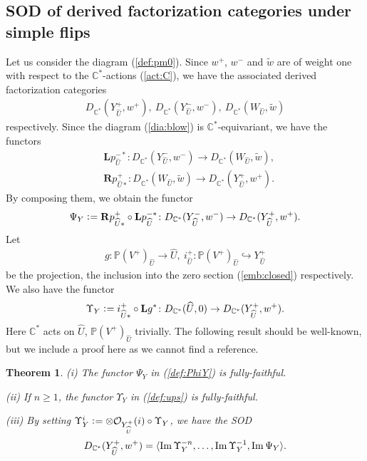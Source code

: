 \documentclass[11pt]{amsart}
\theoremstyle{plain}
\newtheorem{thm}{Theorem}[section]
\newcommand{\oO}{\mathcal{O}}
\newcommand{\dR}{\mathbf{R}}
\newcommand{\dL}{\mathbf{L}}
\newcommand{\Imm}{\mathop{\rm Im}\nolimits}
\begin{document}
\subsection{SOD of derived factorization categories under simple flips}
Let us consider the diagram (\ref{def:pm0}). 
Since $w^+$, $w^-$ and $\widetilde{w}$ are of
weight one with respect to the 
$\mathbb{C}^{\ast}$-actions (\ref{act:C}), 
we have the 
associated derived factorization categories
\begin{align*}
D_{\mathbb{C}^{\ast}}(Y_{\widehat{U}}^+, w^+), \ 
D_{\mathbb{C}^{\ast}}(Y_{\widehat{U}}^-, w^-), \ 
D_{\mathbb{C}^{\ast}}(W_{\widehat{U}}, \widetilde{w})
\end{align*}
respectively. 
Since the diagram (\ref{dia:blow}) is $\mathbb{C}^{\ast}$-equivariant, 
we have the functors
\begin{align*}
&\dL p_{\widehat{U}}^{-\ast} \colon 
D_{\mathbb{C}^{\ast}}(Y^-_{\widehat{U}}, w^-)
\to D_{\mathbb{C}^{\ast}}(W_{\widehat{U}}, \widetilde{w}), \\ 
&\dR p_{\widehat{U}\ast}^+ \colon 
D_{\mathbb{C}^{\ast}}(W_{\widehat{U}}, \widetilde{w})
\to 
D_{\mathbb{C}^{\ast}}(Y_{\widehat{U}}^+, w^+).
\end{align*}
By composing them, we obtain the functor
\begin{align}\label{def:PhiY}
\Psi_Y \cneq \dR p_{\widehat{U}\ast}^+ \circ \dL p_{\widehat{U}}^{-\ast} \colon 
D_{\mathbb{C}^{\ast}}(Y^-_{\widehat{U}}, w^-)
\to
D_{\mathbb{C}^{\ast}}(Y_{\widehat{U}}^+, w^+).
\end{align}
Let
\begin{align*}
g \colon \mathbb{P}(V^+)_{\widehat{U}} \to \widehat{U}, \
i_{\widehat{U}}^+ \colon \mathbb{P}(V^+)_{\widehat{U}} \hookrightarrow 
Y_{\widehat{U}}^+
\end{align*}
 be the projection, 
the inclusion into the zero section (\ref{emb:closed})
respectively.  
We also have the functor
\begin{align}\label{def:ups}
\Upsilon_Y \cneq i^{+}_{\widehat{U}\ast} \circ \dL g^{\ast} \colon
 D_{\mathbb{C}^{\ast}}(\widehat{U}, 0) \to 
D_{\mathbb{C}^{\ast}}(Y_{\widehat{U}}^+, w^+).
\end{align}
Here $\mathbb{C}^{\ast}$ acts on 
$\widehat{U}$, $\mathbb{P}(V^+)_{\widehat{U}}$ trivially. 
The following result should be well-known, 
but we include a proof here as we cannot find a reference. 
\begin{thm}\label{thm:deq}
(i) 
The functor $\Psi_Y$ in (\ref{def:PhiY}) 
is fully-faithful. 

(ii) If $n\ge 1$, the functor 
$\Upsilon_Y$ in (\ref{def:ups}) is fully-faithful. 

(iii)
By setting $\Upsilon_Y^i \cneq \otimes \oO_{Y_{\widehat{U}}^+}(i) \circ \Upsilon_Y$, 
we have 
the SOD
\begin{align*}
D_{\mathbb{C}^{\ast}}(Y_{\widehat{U}}^+, w^+)
=\langle \Imm \Upsilon_Y^{-n}, \ldots, \Imm \Upsilon_Y^{-1}, 
\Imm \Psi_Y \rangle. 
\end{align*}
\end{thm}
\end{document}
